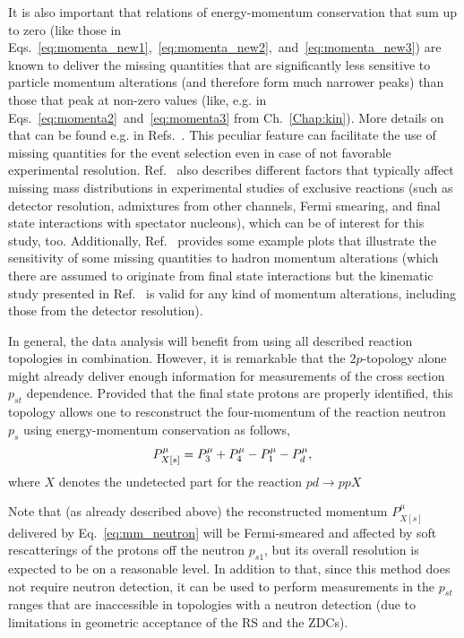It is also important that relations of energy-momentum conservation that sum up to zero (like those in Eqs.~\eqref{eq:momenta_new1},~\eqref{eq:momenta_new2},~and~\eqref{eq:momenta_new3}) are known to deliver the missing quantities that are significantly less sensitive to particle momentum alterations (and therefore form much narrower peaks) than those that peak at non-zero values (like, e.g. in Eqs.~\eqref{eq:momenta2}~and~\eqref{eq:momenta3} from Ch.~\ref{Chap:kin}). More details on that can be found e.g. in Refs.~\cite{CLAS:2023mfc,my_an_note:2020,my_thesis:2021,note_mm_distr}. This peculiar feature can facilitate the use of missing quantities for the event selection even in case of not favorable experimental resolution. Ref.~\cite{note_mm_distr} also describes different factors that typically affect missing mass distributions in experimental studies of exclusive reactions (such as detector resolution, admixtures from other channels, Fermi smearing, and final state interactions with spectator nucleons), which can be of interest for this study, too. Additionally, Ref.~\cite{note_mm_distr} provides some example plots that illustrate the sensitivity of some missing quantities to hadron momentum alterations (which there are assumed to originate from final state interactions but the kinematic study presented in Ref.~\cite{note_mm_distr} is valid for any kind of momentum alterations, including those from the detector resolution).


In general, the data analysis will benefit from using all described reaction topologies in combination. However, it is remarkable that the $2p$-topology alone might already deliver enough information for measurements of the cross section $p_{st}$ dependence. Provided that the final state protons are properly identified, this topology allows one to resconstruct the four-momentum of the reaction neutron $p_{s}$ using energy-momentum conservation as follows,
\begin{equation}
P_{X[s]}^{\mu}= P_{3}^{\mu}+P_{4}^{\mu} -P_{1}^{\mu} -P_{d}^{\mu},\\
\label{eq:mm_neutron}
\end{equation}
where $X$ denotes the undetected part for the reaction $pd\rightarrow ppX$

Note that (as already described above) the reconstructed momentum $P_{X[s]}^{\mu}$ delivered by Eq.~\eqref{eq:mm_neutron} will be Fermi-smeared and affected by soft rescatterings of the protons off the neutron $p_{s1}$, but its overall resolution is expected to be on a reasonable level. In addition to that, since this method does not require neutron detection, it can be used to perform measurements in the $p_{st}$ ranges that are inaccessible in topologies with a neutron detection (due to limitations in geometric acceptance of the RS and the ZDCs).  




